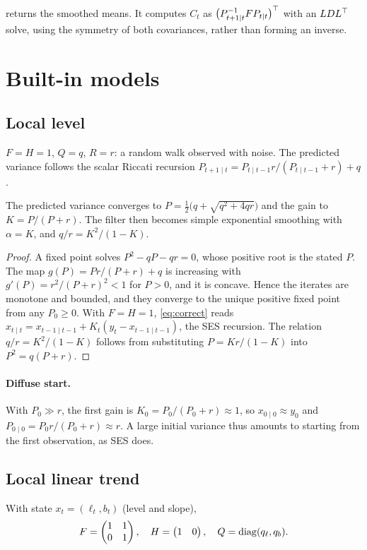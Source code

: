 \documentclass[11pt,a4paper]{article}
\begin{document}
 returns the smoothed means. It computes
$C_t$ as $\big(P_{t+1\mid t}^{-1}FP_{t\mid t}\big)^\top$ with an $LDL^\top$ solve,
using the symmetry of both covariances, rather than forming an inverse.

\section{Built-in models}

\subsection{Local level}
$F=H=1$, $Q=q$, $R=r$: a random walk observed with noise. The predicted variance
follows the scalar Riccati recursion
$P_{t+1\mid t} = P_{t\mid t-1}r/(P_{t\mid t-1}+r) + q$.

\begin{proposition}\label{prop:ll-steady}
The predicted variance converges to $P=\tfrac12\big(q+\sqrt{q^2+4qr}\big)$ and
the gain to $K=P/(P+r)$. The filter then becomes simple exponential smoothing with
$\alpha=K$, and $q/r=K^2/(1-K)$.
\end{proposition}
\begin{proof}
A fixed point solves $P^2-qP-qr=0$, whose positive root is the stated $P$. The map
$g(P)=Pr/(P+r)+q$ is increasing with $g'(P)=r^2/(P+r)^2<1$ for $P>0$, and it is
concave. Hence the iterates are monotone and bounded, and they converge to the
unique positive fixed point from any $P_0\ge0$. With $F=H=1$, \eqref{eq:correct}
reads $x_{t\mid t}=x_{t-1\mid t-1}+K_t(y_t-x_{t-1\mid t-1})$, the SES recursion. The
relation $q/r=K^2/(1-K)$ follows from substituting $P=Kr/(1-K)$ into
$P^2=q(P+r)$.
\end{proof}

\paragraph{Diffuse start.}
With $P_0\gg r$, the first gain is $K_0=P_0/(P_0+r)\approx1$, so
$x_{0\mid0}\approx y_0$ and $P_{0\mid0}=P_0r/(P_0+r)\approx r$. A large initial
variance thus amounts to starting from the first observation, as SES does.

\subsection{Local linear trend}
With state $x_t=(\ell_t,b_t)$ (level and slope),
\[
  F=\begin{pmatrix}1&1\\0&1\end{pmatrix},\quad H=\begin{pmatrix}1&0\end{pmatrix},\quad
  Q=\operatorname{diag}(q_\ell,q_b).
\]
\end{document}

